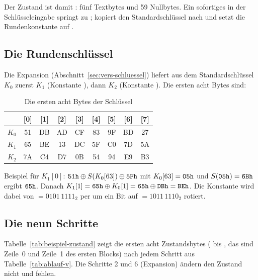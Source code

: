 Der Zustand ist damit : fünf Textbytes und 59 Nullbytes. Ein sofortiges  in der Schlüsseleingabe springt zu ;  kopiert den Standardschlüssel nach  und setzt die Rundenkonstante auf .

\subsection{Die Rundenschlüssel}
Die Expansion (Abschnitt~\ref{sec:vers-schluessel}) liefert aus dem Standardschlüssel $K_0$ zuerst $K_1$ (Konstante ), dann $K_2$ (Konstante ). Die ersten acht Bytes sind:

\begin{table}[!htbp]
    \centering
    \small
    \caption{Die ersten acht Bytes der Schlüssel}\label{tab:beispiel-keys}
    \begin{tabular}{@{}lcccccccc@{}}
        \toprule
        & [0] & [1] & [2] & [3] & [4] & [5] & [6] & [7] \\
        \midrule
        $K_0$ & 51 & DB & AD & CF & 83 & 9F & BD & 27 \\
        $K_1$ & 65 & BE & 13 & DC & 5F & C0 & 7D & 5A \\
        $K_2$ & 7A & C4 & D7 & 0B & 54 & 94 & E9 & B3 \\
        \bottomrule
    \end{tabular}
\end{table}

Beispiel für $K_1[0]$: $\texttt{51h}\oplus S(K_0[63])\oplus\texttt{5Fh}$ mit $K_0[63]=\texttt{05h}$ und $S(\texttt{05h})=\texttt{6Bh}$ ergibt $\texttt{65h}$. Danach $K_1[1]=\texttt{65h}\oplus K_0[1]=\texttt{65h}\oplus\texttt{DBh}=\texttt{BEh}$. Die Konstante wird dabei von $=0101\,1111_2$ per  um ein Bit auf $=1011\,1110_2$ rotiert.

\subsection{Die neun Schritte}
Tabelle~\ref{tab:beispiel-zustand} zeigt die ersten acht Zustandsbytes ( bis , das sind Zeile~0 und Zeile~1 des ersten Blocks) nach jedem Schritt aus Tabelle~\ref{tab:ablauf-v}. Die Schritte 2 und 6 (Expansion) ändern den Zustand nicht und fehlen.

